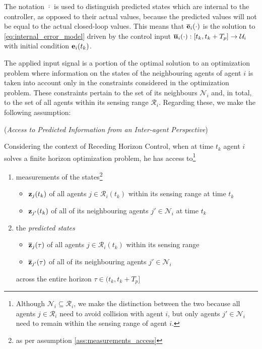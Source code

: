 The notation $\overline{\cdot}$ is used to distinguish predicted states which
are internal to the controller, as opposed to their actual values, because
the predicted values will not be equal to the actual closed-loop values. This
means that $\overline{\bm{\mathbf{e}}}_i(\cdot)$ is the solution to
\eqref{eq:internal_error_model} driven by the control input
$\overline{\bm{\mathbf{u}}}_i(\cdot) : [t_k, t_k + T_p] \to \mathcal{U}_i$ with
initial condition $\bm{\mathbf{e}}_i(t_k)$.

The applied input signal is a portion of the optimal solution to an
optimization problem where information on the states of the neighbouring
agents of agent $i$ is taken into account only in the constraints considered
in the optimization problem. These constraints pertain to the set of its
neighbours $\mathcal{N}_i$ and, in total, to the set of all agents within its
sensing range $\mathcal{R}_i$. Regarding these, we make the following assumption:

\begin{bw_box}
  \begin{assumption} (\textit{Access to Predicted Information from an
    Inter-agent Perspective})
    \label{ass:access_to_predicted_info_n}

Considering the context of Receding Horizon Control, when
at time $t_k$ agent $i$ solves a finite horizon optimization problem, he has
access to\footnote{Although
  $\mathcal{N}_i \subseteq \mathcal{R}_i$, we make the distinction between
  the two because all agents $j \in \mathcal{R}_i$ need to avoid collision
  with agent $i$, but only agents $j' \in \mathcal{N}_i$ need to remain
  within the sensing range of agent $i$.
}

\begin{enumerate}
  \item measurements of the states\footnote{as per assumption
    \eqref{ass:measurements_access}}
    \begin{itemize}
      \item $\bm{\mathbf{z}}_j(t_k)$ of all agents $j \in \mathcal{R}_i(t_k)$ within its sensing range at time $t_k$
      \item $\bm{\mathbf{z}}_{j'}(t_k)$ of all of its neighbouring agents $j' \in \mathcal{N}_i$ at time $t_k$
      \end{itemize}
    \item the \textit{predicted states}
      \begin{itemize}
        \item $\overline{\bm{\mathbf{z}}}_j(\tau)$ of all agents $j \in \mathcal{R}_i(t_k)$ within its sensing range
        \item $\overline{\bm{\mathbf{z}}}_{j'}(\tau)$ of all of its neighbouring agents $j' \in \mathcal{N}_i$
      \end{itemize}
      across the entire horizon $\tau \in (t_k, t_k + T_p]$
\end{enumerate}
\end{assumption}
\end{bw_box}


